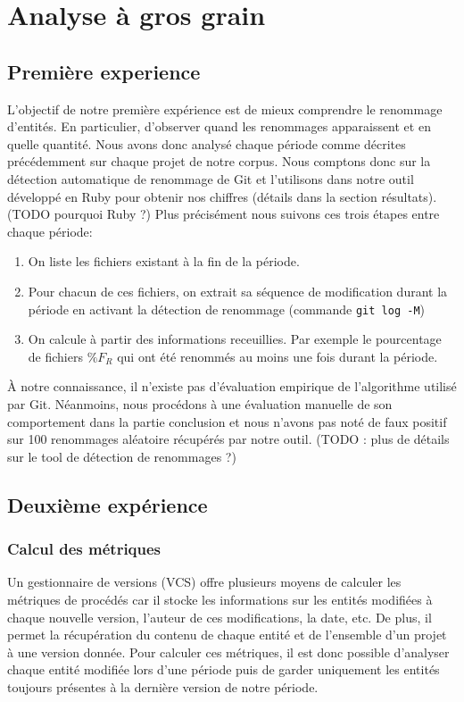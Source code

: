 \section{Analyse à gros grain}
\label{sec:analyse_gros_grain}

\subsection{Première experience}
L'objectif de notre première expérience est de mieux comprendre le renommage d'entités. En particulier, d'observer quand les renommages apparaissent et en quelle quantité. Nous avons donc analysé chaque période comme décrites précédemment sur chaque projet de notre corpus. Nous comptons donc sur la détection automatique de renommage de Git et l'utilisons dans notre outil développé en Ruby pour obtenir nos chiffres (détails dans la section résultats). (TODO pourquoi Ruby ?) Plus précisément nous suivons ces trois étapes entre chaque période:
\begin{enumerate}
\item On liste les fichiers existant à la fin de la période.
\item Pour chacun de ces fichiers, on extrait sa séquence de modification durant la période en activant la détection de renommage (commande \texttt{git log -M})
\item On calcule à partir des informations receuillies. Par exemple le pourcentage de fichiers $\%F_{R}$ qui ont été renommés au moins une fois durant la période.
\end{enumerate}

À notre connaissance, il n'existe pas d'évaluation empirique de l'algorithme utilisé par Git. Néanmoins, nous procédons à une évaluation manuelle de son comportement dans la partie conclusion et nous n'avons pas noté de faux positif sur 100 renommages aléatoire récupérés par notre outil. (TODO : plus de détails sur le tool de détection de renommages ?)\\

\subsection{Deuxième expérience}

\subsubsection{Calcul des métriques}
Un gestionnaire de versions (VCS) offre plusieurs moyens de calculer les métriques de procédés car il stocke les informations sur les entités modifiées à chaque nouvelle version, l'auteur de ces modifications, la date, etc. De plus, il permet la récupération du contenu de chaque entité et de l'ensemble d'un projet à une version donnée. Pour calculer ces métriques, il est donc possible d'analyser chaque entité modifiée lors d'une période puis de garder uniquement les entités toujours présentes à la dernière version de notre période.

